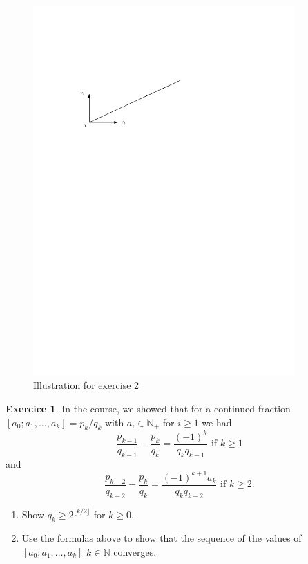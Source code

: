 \documentclass[12pt,a4paper]{article}
\theoremstyle{plain}
\newtheorem*{Sol*}{Solution}
\theoremstyle{definition}
\newtheorem{Ex}{Exercice}
\newif\ifsolutions
\newcommand{\exercise}[2]{
			\begin{Ex} #1 \end{Ex}
			\ifsolutions  \begin{Sol*} #2 \end{Sol*} \bigskip \else \bigskip  \fi
		}
\begin{document}
  \begin{figure}[h]
    \begin{center}
    \includegraphics[width=10cm]{Figure2.pdf}
    \caption{Illustration for exercise 2}
          
    \end{center}

  \end{figure}


  \exercise{
    In the course, we showed that for a continued fraction $[a_0;a_1,\dots,a_k] = p_k / q_k$ with $a_i∈ ℕ_+$  for $i≥ 1$  we had
    \begin{displaymath}
      \frac{p_{k-1}}{q_{k-1}} - \frac{p_k}{q_k} = \frac{(-1)^k}{q_k q_{k-1}} \text{ if } k≥1
    \end{displaymath}
    and
    \begin{displaymath}
      \frac{p_{k-2}}{q_{k-2}} - \frac{p_k}{q_k} = \frac{(-1)^{k+1} a_k}{q_k q_{k-2}} \text{ if } k≥2. 
    \end{displaymath}

    \begin{enumerate}
    \item Show  $q_k ≥ 2^{⌊k/2⌋}$ for $k≥ 0$.
      \item Use the formulas above to show that the sequence of the values of $[a_0;a_1,\dots,a_k]$ $k ∈ ℕ$ converges. 
    \end{enumerate}    
  }{}
\end{document}
